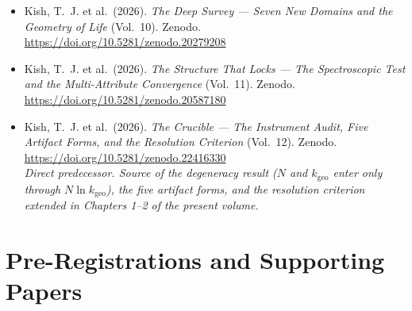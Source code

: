 \documentclass[11pt, letterpaper, openany]{book}
\newcommand{\kgeo}{k_{\mathrm{geo}}}
\begin{document}
\begin{itemize}
{          The First Survey of a New Field} (Vol.~9).
          Zenodo. \url{https://doi.org/10.5281/zenodo.19935603}
    \item Kish, T.~J. et al.\ (2026). \textit{The Deep Survey --- Seven New Domains and the
          Geometry of Life} (Vol.~10).
          Zenodo. \url{https://doi.org/10.5281/zenodo.20279208}
    \item Kish, T.~J. et al.\ (2026). \textit{The Structure That Locks --- The Spectroscopic
          Test and the Multi-Attribute Convergence} (Vol.~11).
          Zenodo. \url{https://doi.org/10.5281/zenodo.20587180}
    \item Kish, T.~J. et al.\ (2026). \textit{The Crucible --- The Instrument Audit, Five
          Artifact Forms, and the Resolution Criterion} (Vol.~12).
          Zenodo. \url{https://doi.org/10.5281/zenodo.22416330}
          \\ \textit{Direct predecessor. Source of the degeneracy result
          ($N$ and $\kgeo$ enter only through $N\ln\kgeo$), the five artifact forms, and the
          resolution criterion extended in Chapters 1--2 of the present volume.}
\end{itemize}

\section*{Pre-Registrations and Supporting Papers}
\end{document}
